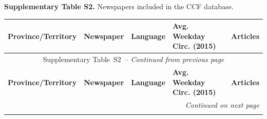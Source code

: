 \documentclass[12pt]{article}
\makeatletter
\let\CCFlandscape@orig\landscape
\renewcommand{\landscape}{%
  \CCFlandscape@orig
  \setlength{\textwidth}{\dimexpr\paperheight-5cm\relax}%
  \setlength{\linewidth}{\textwidth}%
  \setlength{\hsize}{\textwidth}%
  \setlength{\columnwidth}{\textwidth}%
}
\renewcommand\_{\texttt{\detokenize{_}\allowbreak}}
\makeatother
\begin{document}
\landscape
\noindent\textbf{Supplementary Table S2.} Newspapers included in the CCF database.
\vspace{0.5em}
{\footnotesize
{}
\label{tab:newspapers}
\begin{longtable}{llllr}
\toprule
\textbf{Province/Territory} & \textbf{Newspaper} & \textbf{Language} & \textbf{Avg. Weekday Circ. (2015)} & \textbf{Articles} \\
\midrule
\endfirsthead
\multicolumn{5}{c}{Supplementary Table~S2\ -- \textit{Continued from previous page}} \\
\toprule
\textbf{Province/Territory} & \textbf{Newspaper} & \textbf{Language} & \textbf{Avg. Weekday Circ. (2015)} & \textbf{Articles} \\
\midrule
\endhead
\midrule
\multicolumn{5}{r}{\textit{Continued on next page}} \\
\endfoot
\bottomrule
\endlastfoot


\end{longtable}}
\end{document}

